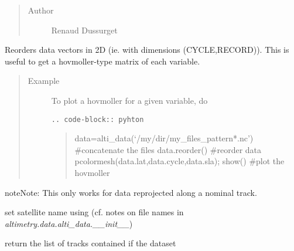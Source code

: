 \documentclass[letterpaper,10pt,english]{sphinxmanual}
\begin{document}
\begin{fulllineitems}
\begin{fulllineitems}
\begin{quote}
\begin{description}
\item[{Author }] \leavevmode
Renaud Dussurget

\end{description}\end{quote}

\end{fulllineitems}


\begin{fulllineitems}
\label{altimetry.data:altimetry.data.alti_data.reorder}
Reorders data vectors in 2D (ie. with dimensions (CYCLE,RECORD)). This is useful to get a hovmoller-type matrix of each variable.
\begin{quote}\begin{description}
\item[{Example }] \leavevmode
To plot a hovmoller for a given variable, do

\begin{Verbatim}[commandchars=\\\{\}]
.. code-block:: pyhton
\end{Verbatim}
\begin{quote}

data=alti\_data(`/my/dir/my\_files\_pattern*.nc') \#concatenate the files
data.reorder() \#reorder data
pcolormesh(data.lat,data.cycle,data.sla); show() \#plot the hovmoller
\end{quote}

\end{description}\end{quote}

\begin{notice}{note}{Note:}
This only works for data reprojected along a nominal track.
\end{notice}

\end{fulllineitems}


\begin{fulllineitems}
\label{altimetry.data:altimetry.data.alti_data.set_sats}
set satellite name using (cf. notes on file names in \emph{altimetry.data.alti\_data.\_\_init\_\_})

\end{fulllineitems}


\begin{fulllineitems}
\label{altimetry.data:altimetry.data.alti_data.track_list}
return the list of tracks contained if the dataset

\end{fulllineitems}


\end{fulllineitems}
\end{document}

